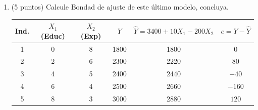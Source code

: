 \documentclass[10pt,a4paper]{article}
\begin{document}
\begin{enumerate}
\begin{enumerate}
Se sabe que:
\[
\hat\beta=(X^{\!t}X)^{-1}X^{\!t}Y.
\]
Dado
\[
(X^{\!t}X)^{-1}=
\begin{pmatrix}
145 & -11.5 & -19 \\
-11.5 & 0.925 & 1.5 \\
-19 & 1.5 & 2.5
\end{pmatrix},
\]
se tiene la \textbf{forma matricial explícita}:
\[
\hat\beta=
\underbrace{\begin{pmatrix}
145 & -11.5 & -19 \\
-11.5 & 0.925 & 1.5 \\
-19 & 1.5 & 2.5
\end{pmatrix}}_{(X^{\!t}X)^{-1}}
\underbrace{\begin{pmatrix}
12000\\ 53200\\ 59200
\end{pmatrix}}_{X^{\!t}Y}
=
\begin{pmatrix}
145(12000)-11.5(53200)-19(59200)\\[2pt]
-11.5(12000)+0.925(53200)+1.5(59200)\\[2pt]
-19(12000)+1.5(53200)+2.5(59200)
\end{pmatrix}.
\]

Por lo que cada beta es:
\[
\begin{aligned}
\hat\beta_0&=1{,}740{,}000\;-\;611{,}800\;-\;1{,}124{,}800 \;=\; \boxed{3400},\\[4pt]
\hat\beta_1&=-138{,}000\;+\;49{,}610\;+\;88{,}800 \;=\; \boxed{10},\\[4pt]
\hat\beta_2&=-228{,}000\;+\;79{,}800\;+\;148{,}000 \;=\; \boxed{-200}.
\end{aligned}
\]

Y la regresión quedaría:
\[
\boxed{\;\widehat{Salario}=\hat\beta_0+\hat\beta_1\,Educ+\hat\beta_2\,Exp
=3400\;+\;10\cdot Educ\;-\;200\cdot Exp\;}
\]

    \item (5 puntos) Calcule Bondad de ajuste de este último modelo, concluya.

\begin{center}
\begin{tabular}{cccccc}
\toprule
Ind. & $X_1$ (Educ) & $X_2$ (Exp) & $Y$ & $\hat Y=3400+10X_1-200X_2$ & $e=Y-\hat Y$ \\
\midrule
1 & 0 & 8 & 1800 & 1800 & $0$ \\
2 & 2 & 6 & 2300 & 2220 & $80$ \\
3 & 4 & 5 & 2400 & 2440 & $-40$ \\
4 & 6 & 4 & 2500 & 2660 & $-160$ \\
5 & 8 & 3 & 3000 & 2880 & $120$ \\
\bottomrule
\end{tabular}
\end{center}



\end{enumerate}
\end{enumerate}
\end{document}
